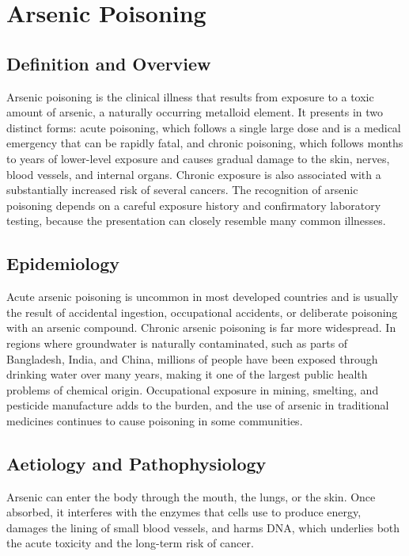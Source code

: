 \chapter{Arsenic Poisoning}

\section*{Definition and Overview}
Arsenic poisoning is the clinical illness that results from exposure to a toxic amount of arsenic, a naturally occurring metalloid element. It presents in two distinct forms: acute poisoning, which follows a single large dose and is a medical emergency that can be rapidly fatal, and chronic poisoning, which follows months to years of lower-level exposure and causes gradual damage to the skin, nerves, blood vessels, and internal organs. Chronic exposure is also associated with a substantially increased risk of several cancers. The recognition of arsenic poisoning depends on a careful exposure history and confirmatory laboratory testing, because the presentation can closely resemble many common illnesses.

\section*{Epidemiology}
Acute arsenic poisoning is uncommon in most developed countries and is usually the result of accidental ingestion, occupational accidents, or deliberate poisoning with an arsenic compound. Chronic arsenic poisoning is far more widespread. In regions where groundwater is naturally contaminated, such as parts of Bangladesh, India, and China, millions of people have been exposed through drinking water over many years, making it one of the largest public health problems of chemical origin. Occupational exposure in mining, smelting, and pesticide manufacture adds to the burden, and the use of arsenic in traditional medicines continues to cause poisoning in some communities.

\section*{Aetiology and Pathophysiology}
Arsenic can enter the body through the mouth, the lungs, or the skin. Once absorbed, it interferes with the enzymes that cells use to produce energy, damages the lining of small blood vessels, and harms DNA, which underlies both the acute toxicity and the long-term risk of cancer.


